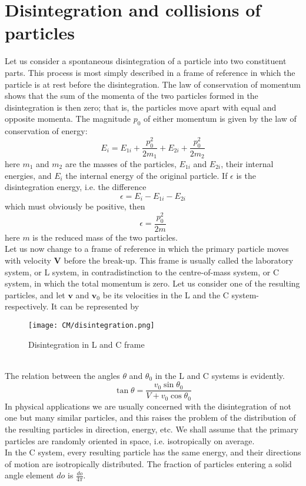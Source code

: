 \section{Disintegration and collisions of particles}
Let us consider a spontaneous disintegration of a particle into two constituent parts. 
This process is most simply described in a frame of reference in which the particle is at rest before the disintegration.
The law of conservation of momentum shows that the sum of the momenta of the two particles formed in the disintegration is then zero; that is, the particles move apart with equal and
opposite momenta. The magnitude $p_0$ of either momentum is given by the law of conservation of energy:
\[E_i = E_{1i} + \frac{p_0^2}{2m_1} + E_{2i} + \frac{p_0^2}{2m_2}\]
here $m_1$ and $m_2$ are the masses of the particles, $E_{1i}$ and $E_{2i}$, their internal energies, and $E_{i}$ the internal energy of the original particle. If $\epsilon$ is the disintegration energy, i.e. the difference
\[\epsilon = E_i - E_{1i} - E_{2i}\]
which must obviously be positive, then
\[\epsilon = \frac{p_0^2}{2m}\]
here $m$ is the reduced mass of the two particles.\\
Let us now change to a frame of reference in which the primary particle moves with velocity $\bm{V}$ before the break-up. 
This frame is usually called the laboratory system, or L system, in contradistinction to the centre-of-mass
system, or C system, in which the total momentum is zero. 
Let us consider one of the resulting particles, and let $\bm{v}$ and $\bm{v}_0$ be its velocities in the L and
the C system-respectively. It can be represented by
\begin{figure}[!h]
	\centering
	\texttt{[image: CM/disintegration.png]}
	\caption{Disintegration in L and C frame}
\end{figure}\\
The relation between the angles $\theta$ and $\theta_0$ in the L and C systems is evidently.
\[\tan\theta = \frac{v_0\sin\theta_0}{V+v_0\cos\theta_0}\]
In physical applications we are usually concerned with the disintegration of not one but many similar particles, and this raises the problem of the distribution of the resulting particles in direction, energy, etc. 
We shall assume that the primary particles are randomly oriented in space, i.e. isotropically on average.\\
In the C system, every resulting particle has the same energy, and their directions of motion are isotropically distributed. The fraction of particles entering a solid angle element $do$ is $\frac{do}{4\pi}$. 
